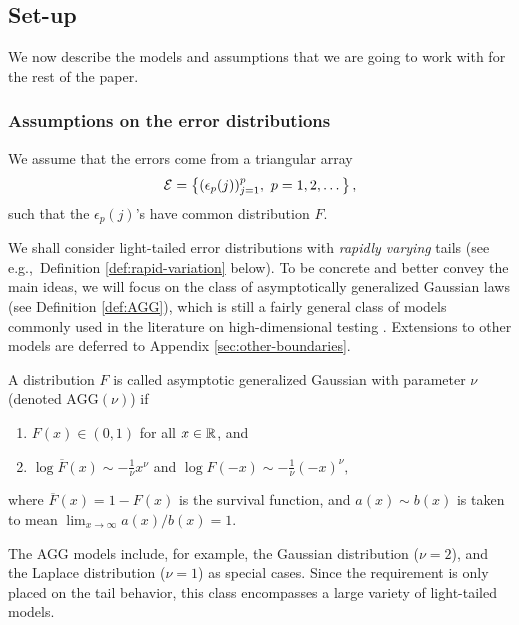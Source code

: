 \subsection{Set-up} \label{subsec:set-up}

We now describe the models and assumptions that we are going to work with for the rest of the paper.

\subsubsection{Assumptions on the error distributions}

We assume that the errors come from a triangular array
\begin{equation}
\label{eq:error-array}
{\cal E} = \left\{ (\epsilon_p(j))_{j=1}^p,\ p=1,2,\dots\right\},
\end{equation}
such that the $\epsilon_p(j)$'s have common distribution $F$.

We shall consider light-tailed error distributions with {\em rapidly varying} tails (see e.g.,\ Definition \ref{def:rapid-variation} below). 
To be concrete and better convey the main ideas, we will focus on the class of asymptotically generalized Gaussian laws (see Definition \ref{def:AGG}), which is still a fairly general class of models commonly used in the literature on high-dimensional testing \citep{cai2007estimation, arias2017distribution}.
Extensions to other models are deferred to Appendix \ref{sec:other-boundaries}.

\begin{definition} \label{def:AGG}
A distribution $F$ is called asymptotic generalized Gaussian with parameter $\nu$ (denoted $\text{AGG}(\nu)$) if
\begin{enumerate}
    \item $F(x)\in(0,1)$ for all $x\in\mathbb R$, and \smallskip
    \item $\log{\overline{F}(x)} \sim -\frac{1}{\nu}x^\nu$ and $\log{F(-x)} \sim -\frac{1}{\nu}(-x)^\nu,$ \label{eq:AGG}
\end{enumerate}
where $\overline{F}(x) = 1 - F(x)$ is the survival function, and $a(x)\sim b(x)$ is taken to mean $\lim_{x\to\infty} a(x)/b(x) = 1$.
\end{definition}

The AGG models include, for example, the Gaussian distribution ($\nu = 2$), and the Laplace distribution ($\nu = 1$) as special cases. 
Since the requirement is only placed on the tail behavior, this class encompasses a large variety of light-tailed models.

